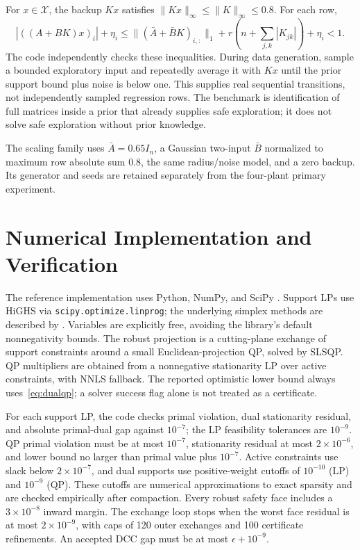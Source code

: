 \documentclass{l4dc2026}
\newcommand{\X}{\mathcal X}
\begin{document}
For $x\in\X$, the backup $Kx$ satisfies $\|Kx\|_\infty\leq\|K\|_\infty\leq0.8$. For each row,
\begin{equation}
 |((A+BK)x)_i|+\eta_i\leq
 \| (\bar A+\bar BK)_{i,:}\|_1+r\left(n+\sum_{j,k}|K_{jk}|\right)+\eta_i<1.
\end{equation}
The code independently checks these inequalities. During data generation, sample a bounded exploratory input and repeatedly average it with $Kx$ until the prior support bound plus noise is below one. This supplies real sequential transitions, not independently sampled regression rows. The benchmark is identification of full matrices inside a prior that already supplies safe exploration; it does not solve safe exploration without prior knowledge.

The scaling family uses $\bar A=0.65I_n$, a Gaussian two-input $\bar B$ normalized to maximum row absolute sum $0.8$, the same radius/noise model, and a zero backup. Its generator and seeds are retained separately from the four-plant primary experiment.

\section{Numerical Implementation and Verification}\label{app:numerics}
The reference implementation uses Python, NumPy, and SciPy \citep{virtanen2020}. Support LPs use HiGHS via \texttt{scipy.optimize.linprog}; the underlying simplex methods are described by \citet{huang2018}. Variables are explicitly free, avoiding the library's default nonnegativity bounds. The robust projection is a cutting-plane exchange of support constraints around a small Euclidean-projection QP, solved by SLSQP. QP multipliers are obtained from a nonnegative stationarity LP over active constraints, with NNLS fallback. The reported optimistic lower bound always uses~\eqref{eq:dualqp}; a solver success flag alone is not treated as a certificate.

For each support LP, the code checks primal violation, dual stationarity residual, and absolute primal-dual gap against $10^{-7}$; the LP feasibility tolerances are $10^{-9}$. QP primal violation must be at most $10^{-7}$, stationarity residual at most $2\times10^{-6}$, and lower bound no larger than primal value plus $10^{-7}$. Active constraints use slack below $2\times10^{-7}$, and dual supports use positive-weight cutoffs of $10^{-10}$ (LP) and $10^{-9}$ (QP). These cutoffs are numerical approximations to exact sparsity and are checked empirically after compaction. Every robust safety face includes a $3\times10^{-8}$ inward margin. The exchange loop stops when the worst face residual is at most $2\times10^{-9}$, with caps of 120 outer exchanges and 100 certificate refinements. An accepted DCC gap must be at most $\epsilon+10^{-9}$.
\end{document}
